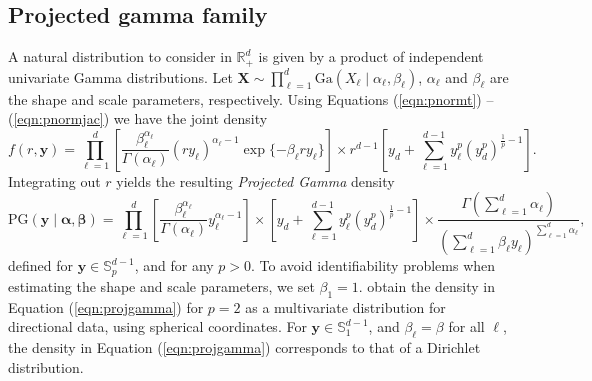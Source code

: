 \subsection{Projected gamma family\label{subsec:projgamma}}
  A natural  distribution to consider in ${\mathbb R}^d_+$ is given by a product of independent
  univariate Gamma distributions. Let
    $\bm{ X} \sim \prod_{\ell = 1}^d\text{Ga}\left(X_{\ell}\mid\alpha_{\ell},\beta_{\ell}\right)$, 
    $\alpha_\ell$ and $\beta_\ell$ are the shape and scale parameters, respectively. Using Equations (\ref{eqn:pnormt}) -- (\ref{eqn:pnormjac}) we have the joint density
  \begin{equation}
  \label{joint}
    f(r,\bm{ y}) = \prod_{\ell = 1}^{d}
      \left[\frac{\beta_{\ell}^{\alpha_{\ell}}}{\Gamma(\alpha_{\ell})}(ry_{\ell})^{\alpha_{\ell} - 1}
          \exp\lbrace-\beta_{\ell}ry_{\ell}\rbrace\right]
      \times r^{d-1}\left[y_d +
            {\textstyle \sum}_{\ell = 1}^{d-1}y_{\ell}^p\left(y_d^p\right)^{\frac{1}{p} - 1}\right].
  \end{equation}
  Integrating out $r$ yields the resulting \emph{Projected Gamma} density
  \begin{equation}
    \label{eqn:projgamma}
    \text{PG}(\bm{ y}\mid\bm{ \alpha},\bm{ \beta}) =
          \prod_{\ell = 1}^d\left[\frac{\beta_{\ell}^{\alpha_{\ell}}}{\Gamma(\alpha_{\ell})}
                y_{\ell}^{\alpha_{\ell} - 1}\right]
      \times \left[y_d +
          {\textstyle \sum}_{\ell = 1}^{d-1}y_{\ell}^p\left(y_d^p\right)^{\frac{1}{p} - 1}\right]
      \times \frac{\Gamma({\textstyle\sum}_{\ell = 1}^d\alpha_{\ell})}{\left({\textstyle\sum}_{\ell = 1}^d
                    \beta_{\ell}y_{\ell}\right)^{{\scriptstyle\sum_{\ell = 1}^d \alpha_{\ell}}}} ,
  \end{equation}
  defined for $\bm{y}\in {\mathbb S}_p^{d-1}$, and for any $p>0$. To avoid identifiability problems when estimating the shape and scale parameters, we set $\beta_1 = 1$.
  \cite{nunez2019} obtain the density in Equation (\ref{eqn:projgamma})
  for $p=2$ as a multivariate distribution for directional data, using spherical coordinates.  
  For $\bm{ y}\in {\mathbb S}_1^{d-1}$, and $\beta_{\ell} = \beta$ for all $\ell$, the density in Equation (\ref{eqn:projgamma}) corresponds to that of a Dirichlet distribution.
  
